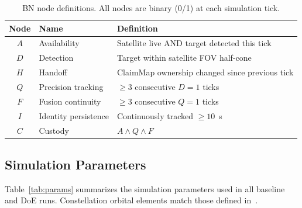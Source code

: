 \documentclass[]{spie}
\begin{document}
\begin{table}[h]
\caption{BN node definitions. All nodes are binary (0/1) at each simulation tick.}
\label{tab:nodes}
\centering
\begin{tabular}{cll}
\toprule
Node & Name & Definition \\
\midrule
$A$ & Availability & Satellite live AND target detected this tick \\
$D$ & Detection & Target within satellite FOV half-cone \\
$H$ & Handoff & ClaimMap ownership changed since previous tick \\
$Q$ & Precision tracking & $\geq 3$ consecutive $D{=}1$ ticks \\
$F$ & Fusion continuity & $\geq 3$ consecutive $Q{=}1$ ticks \\
$I$ & Identity persistence & Continuously tracked $\geq 10$~s \\
$C$ & Custody & $A \wedge Q \wedge F$ \\
\bottomrule
\end{tabular}
\end{table}

\subsection{Simulation Parameters}

Table~\ref{tab:params} summarizes the simulation parameters used in all baseline and DoE runs. Constellation orbital elements match those defined in~\cite{Saeed2026GoDSATRL}.
\end{document}
